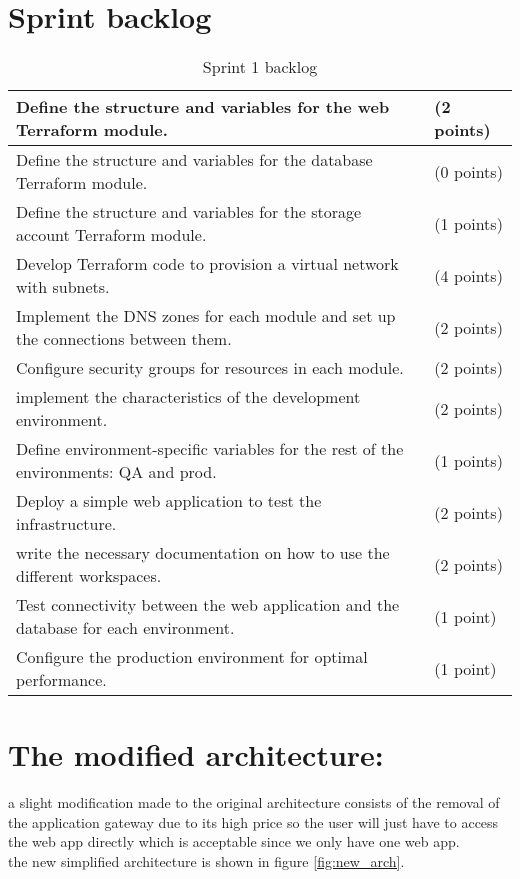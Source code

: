 \section{Sprint backlog}
\begin{longtable}[c]{
    |p{}|
    p{}|
    }
    \caption{Sprint 1 backlog}
    \label{tab:Sprint1_backlog}                                                                       \\
    \hline
    Define the structure and variables for the web Terraform module.                     & (2 points) \\
    \hline
    Define the structure and variables for the database Terraform module.                & (0 points) \\
    \hline
    Define the structure and variables for the storage account Terraform module.         & (1 points) \\
    \hline
    Develop Terraform code to provision a virtual network with subnets.                  & (4 points) \\
    \hline
    Implement the DNS zones for each module and set up the connections between them.     & (2 points) \\
    \hline
    Configure security groups for resources in each module.                              & (2 points) \\
    \hline
    implement the characteristics of the development environment.                        & (2 points) \\
    \hline
    Define environment-specific variables for the rest of the environments: QA and prod. & (1 points) \\
    \hline
    Deploy a simple web application to test the infrastructure.                          & (2 points) \\
    \hline
    write the necessary documentation on how to use the different workspaces.            & (2 points) \\
    \hline
    Test connectivity between the web application and the database for each environment. & (1 point)  \\
    \hline
    Configure the production environment for optimal performance.                        & (1 point)  \\
    \hline
\end{longtable}

\section{The modified architecture:}
a slight modification made to the original architecture consists of the removal of the application gateway due to its high price so the user will just have to access the web app directly which is acceptable since we only have one web app.
\\ the new simplified architecture is shown in figure \ref{fig:new_arch}.

